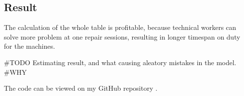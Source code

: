 	\subsection{Result}
The calculation of the whole table is profitable, because technical workers can solve more problem at one repair sessions, resulting in longer timespan on duty for the machines.

\#TODO Estimating result, and what causing aleatory mistakes in the model. 
\#WHY


The code can be viewed on my GitHub repository \cite{GitHub_FP_RUL}.